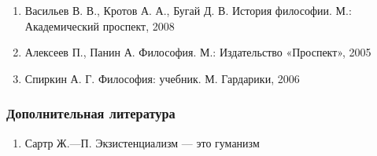 \documentclass{article}
\begin{document}
\begin{enumerate}
    \item Васильев В. В., Кротов А. А., Бугай Д. В. История философии. М.: Академический проспект, 2008
    \item Алексеев П., Панин А. Философия. М.: Издательство «Проспект», 2005
    \item Спиркин А. Г. Философия: учебник. М. Гардарики, 2006
\end{enumerate}

\subsubsection{Дополнительная литература}

\begin{enumerate}
    \item Сартр Ж.—П. Экзистенциализм — это гуманизм
\end{enumerate}
\end{document}
